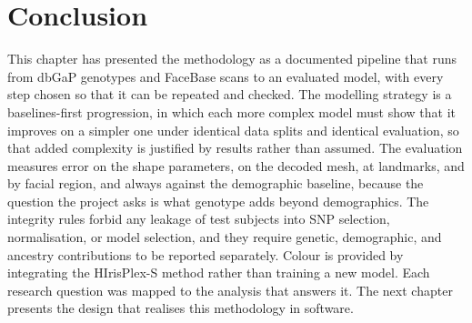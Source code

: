 \section{Conclusion}
This chapter has presented the methodology as a documented pipeline that runs from dbGaP genotypes and FaceBase scans to an evaluated model, with every step chosen so that it can be repeated and checked. The modelling strategy is a baselines-first progression, in which each more complex model must show that it improves on a simpler one under identical data splits and identical evaluation, so that added complexity is justified by results rather than assumed. The evaluation measures error on the shape parameters, on the decoded mesh, at landmarks, and by facial region, and always against the demographic baseline, because the question the project asks is what genotype adds beyond demographics. The integrity rules forbid any leakage of test subjects into SNP selection, normalisation, or model selection, and they require genetic, demographic, and ancestry contributions to be reported separately. Colour is provided by integrating the HIrisPlex-S method rather than training a new model. Each research question was mapped to the analysis that answers it. The next chapter presents the design that realises this methodology in software.
